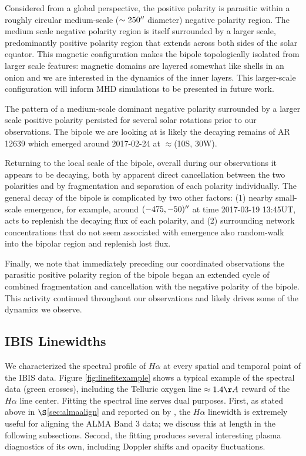 \documentclass[twocolumn]{aastex62}
\newcommand{\secref}[1]{$\S$\ref{#1}}
\newcommand{\halpha}{\ensuremath{H\alpha}}
\begin{document}
Considered from a global perspective, the positive polarity is parasitic within a roughly circular medium-scale ($\sim250\mbox{$^{\prime\prime}$}{}$ diameter) negative polarity region. 
The medium scale negative polarity region is itself surrounded by a larger scale, predominantly positive polarity region that extends across both sides of the solar equator.
This magnetic configuration makes the bipole topologically isolated from larger scale features: magnetic domains are layered somewhat like shells in an onion and we are interested in the dynamics of the inner layers.
This larger-scale configuration will inform MHD simulations to be presented in future work.

The pattern of a medium-scale dominant negative polarity surrounded by a larger scale positive polarity persisted for several solar rotations prior to our observations.
The bipole we are looking at is likely the decaying remains of AR 12639 which emerged around 2017-02-24 at $\approx$(10S, 30W).

Returning to the local scale of the bipole, overall during our observations it appears to be decaying, both by apparent direct cancellation between the two polarities and by fragmentation and separation of each polarity individually.
The general decay of the bipole is complicated by two other factors: (1) nearby small-scale emergence, for example, around $(-475,-50)\mbox{$^{\prime\prime}$}{}$ at time 2017-03-19 13:45UT, acts to replenish the decaying flux of each polarity, and (2) surrounding network concentrations that do not seem associated with emergence also random-walk into the bipolar region and replenish lost flux.

Finally, we note that immediately preceding our coordinated observations the parasitic positive polarity region of the bipole began an extended cycle of combined fragmentation and cancellation with the negative polarity of the bipole.  
This activity continued throughout our observations and likely drives some of the dynamics we observe.

\subsection{IBIS Linewidths}
\label{sec:linewidth}
We characterized the spectral profile of \halpha{} at every spatial and temporal point of the IBIS data.
Figure \ref{fig:linefitexample} shows a typical example of the spectral data (green crosses), including the Telluric oxygen line $\approx1.4\AA{}$ reward of the \halpha{} line center.
Fitting the spectral line serves dual purposes.
First, as stated above in \secref{sec:almaalign} and reported on by \citet{2019Molnar}, the \halpha{} linewidth is extremely useful for aligning the ALMA Band 3 data; we discuss this at length in the following subsections.
Second, the fitting produces several interesting plasma diagnostics of its own, including Doppler shifts and opacity fluctuations.
\end{document}
